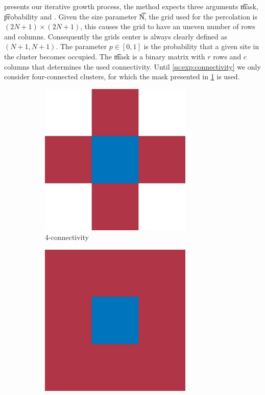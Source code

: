  presents our iterative growth process, the method  expects three arguments \t{mask}, \t{probability} and . Given the size parameter \t{N}, the grid used for the percolation is $(2N + 1) \times (2N + 1)$, this causes the grid to have an uneven number of rows and columns. Consequently the grids center is always clearly defined as $(N + 1, N + 1)$. The parameter $p \in [0, 1]$ is the probability that a given site in the cluster becomes occupied. The \t{mask} is a binary matrix with $r$ rows and $c$ columns that determines the used connectivity. Until \cref{ss:exp:connectivity} we only consider four-connected clusters, for which the mask presented in \cref{fig:exp:connectivity:fourMask} is used.\\

\begin{figure}
	\centering
	\begin{subfigure}{0.45\columnwidth}
		\centering
		\includegraphics[width=0.8\textwidth]{./img/exp_mask_four.jpg}
		\caption{4-connectivity}
		\label{fig:exp:connectivity:fourMask}
	\end{subfigure}
	\begin{subfigure}{0.45\columnwidth}
		\centering
		\includegraphics[width=0.8\textwidth]{./img/exp_mask_eight.jpg}

\end{subfigure}
\end{figure}
